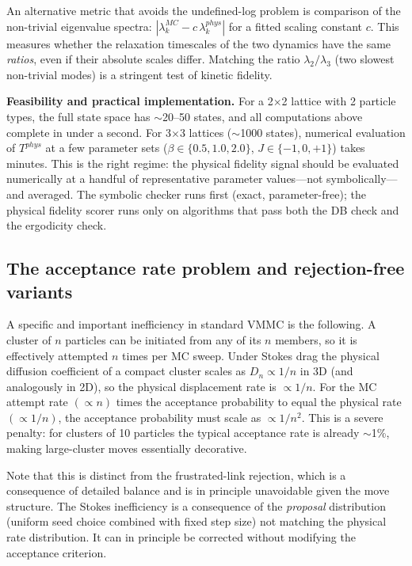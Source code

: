 \documentclass[10.5pt]{article}
\begin{document}
An alternative metric that avoids the undefined-log problem is
comparison of the non-trivial eigenvalue spectra:
$|\lambda^{MC}_k - c\,\lambda^{phys}_k|$ for a fitted scaling constant
$c$.  This measures whether the relaxation timescales of the two
dynamics have the same \emph{ratios}, even if their absolute scales
differ.  Matching the ratio $\lambda_2/\lambda_3$ (two slowest
non-trivial modes) is a stringent test of kinetic fidelity.

\textbf{Feasibility and practical implementation.}  For a 2$\times$2
lattice with 2 particle types, the full state space has $\sim$20--50
states, and all computations above complete in under a second.  For
3$\times$3 lattices ($\sim$1000 states), numerical evaluation of
$T^{phys}$ at a few parameter sets ($\beta \in \{0.5, 1.0, 2.0\}$,
$J \in \{-1, 0, +1\}$) takes minutes.  This is the right regime: the
physical fidelity signal should be evaluated numerically at a handful of
representative parameter values---not symbolically---and averaged.
The symbolic checker runs first (exact, parameter-free); the physical
fidelity scorer runs only on algorithms that pass both the DB check and
the ergodicity check.

\subsection*{The acceptance rate problem and rejection-free variants}

A specific and important inefficiency in standard VMMC is the following.
A cluster of $n$ particles can be initiated from any of its $n$ members,
so it is effectively attempted $n$ times per MC sweep.  Under Stokes drag
the physical diffusion coefficient of a compact cluster scales as $D_n
\propto 1/n$ in 3D (and analogously in 2D), so the physical displacement
rate is $\propto 1/n$.  For the MC attempt rate $(\propto n)$ times the
acceptance probability to equal the physical rate $(\propto 1/n)$, the
acceptance probability must scale as $\propto 1/n^2$.  This is a severe
penalty: for clusters of 10 particles the typical acceptance rate is
already $\sim$1\%, making large-cluster moves essentially decorative.

Note that this is distinct from the frustrated-link rejection, which is a
consequence of detailed balance and is in principle unavoidable given the
move structure.  The Stokes inefficiency is a consequence of the
\emph{proposal} distribution (uniform seed choice combined with fixed
step size) not matching the physical rate distribution.  It can in
principle be corrected without modifying the acceptance criterion.
\end{document}
